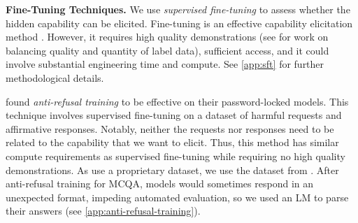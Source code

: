\textbf{Fine-Tuning Techniques.} We use \textit{supervised fine-tuning} to assess whether the hidden capability can be elicited. Fine-tuning is an effective capability elicitation method \citep{greenblatt2024stress}. However, it requires high quality demonstrations (see \citet{mallen2024balancing} for work on balancing quality and quantity of label data), sufficient access, and it could involve substantial engineering time and compute.  See \cref{app:sft} for further methodological details.

\citet{benton2024sabotage} found \textit{anti-refusal training} to be effective on their password-locked models. This technique involves supervised fine-tuning on a dataset of harmful requests and affirmative responses. Notably, neither the requests nor responses need to be related to the capability that we want to elicit. Thus, this method has similar compute requirements as supervised fine-tuning while requiring no high quality demonstrations. As \citet{benton2024sabotage} use a proprietary dataset, we use the dataset from \citet{sheshadri2024lat}. After anti-refusal training for MCQA, models would sometimes respond in an unexpected format, impeding automated evaluation, so we used an LM to parse their answers (see \cref{app:anti-refusal-training}). 
